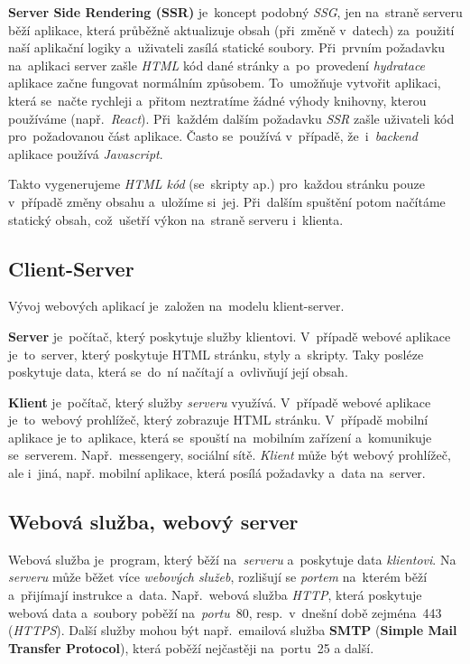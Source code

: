 \documentclass[10pt,a4paper]{article}
\begin{document}
            \textbf{Server Side Rendering (SSR)} je~koncept podobný \emph{SSG}, jen na~straně serveru běží aplikace, která průběžně aktualizuje obsah (při~změně v~datech) za~použití naší aplikační logiky a~uživateli zasílá statické soubory. Při~prvním požadavku na~aplikaci server zašle \emph{HTML} kód dané stránky a~po~provedení \emph{hydratace} aplikace začne fungovat normálním způsobem. To~umožňuje vytvořit aplikaci, která se~načte rychleji a~přitom neztratíme žádné výhody knihovny, kterou používáme (např.~\emph{React}). Při~každém dalším požadavku \emph{SSR} zašle uživateli kód pro~požadovanou část aplikace. Často se~používá v~případě, že~i~\emph{backend} aplikace používá \emph{Javascript}. \cite{uc:ssrandssg}

            Takto vygenerujeme \emph{HTML kód} (se~skripty ap.) pro~každou stránku pouze v~případě změny obsahu a~uložíme si~jej. Při~dalším spuštění potom načítáme statický obsah, což~ušetří výkon na~straně serveru i~klienta.

        \subsection{Client-Server}
            Vývoj webových aplikací je~založen na~modelu klient-server.

            \textbf{Server} je~počítač, který poskytuje služby klientovi. V~případě webové aplikace je~to~server, který poskytuje HTML stránku, styly a~skripty.
            Taky posléze poskytuje data, která se~do~ní načítají a~ovlivňují její obsah.

            \textbf{Klient} je~počítač, který služby \emph{serveru} využívá. V~případě webové aplikace je~to~webový prohlížeč, který zobrazuje HTML stránku.
            V~případě mobilní aplikace je to~aplikace, která se~spouští na~mobilním zařízení a~komunikuje se~serverem. Např.~messengery, sociální sítě. \emph{Klient} může být webový prohlížeč, ale i~jiná, např. mobilní aplikace, která posílá požadavky a~data na~server. \cite{ClientServer}

        \subsection{Webová služba, webový server}
            Webová služba je~program, který běží na~\emph{serveru} a~poskytuje data \emph{klientovi}. Na \emph{serveru} může běžet více \emph{webových služeb}, rozlišují se \emph{portem} na~kterém běží a~přijímají instrukce a~data. Např.~webová služba \emph{HTTP}, která poskytuje webová data a~soubory poběží na~\emph{portu}~80, resp.~v~dnešní době zejména~443 (\emph{HTTPS}). Další služby mohou být např.~emailová služba \textbf{SMTP} (\textbf{Simple Mail Transfer Protocol}), která poběží nejčastěji na~portu~25 a další.
            
\end{document}
